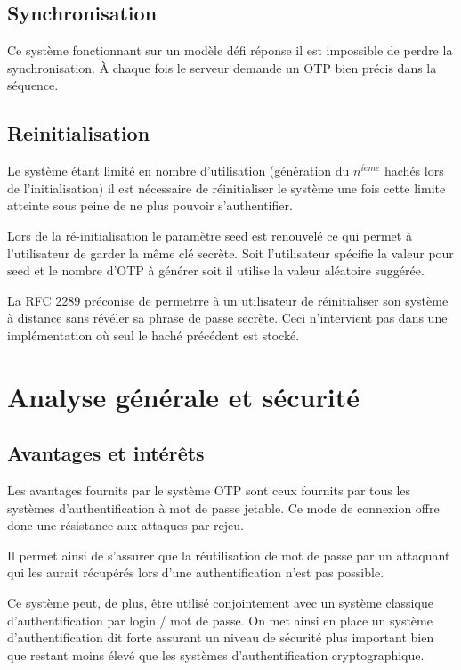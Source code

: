 \documentclass{../res/univ-projet}
\begin{document}
  \subsection{Synchronisation}
    Ce système fonctionnant sur un modèle défi réponse il est impossible de perdre
    la synchronisation. À chaque fois le serveur demande un OTP bien précis dans la séquence.
  
  \subsection{Reinitialisation}
    Le système étant limité en nombre d'utilisation (génération du $n^{i\grave{e}me}$ 
    hachés lors de l'initialisation) il est nécessaire de réinitialiser le système
    une fois cette limite atteinte sous peine de ne plus pouvoir s'authentifier.
    
    Lors de la ré-initialisation le paramètre seed est renouvelé ce qui permet à
    l'utilisateur de garder la même clé secrète. Soit l'utilisateur spécifie la valeur
    pour seed et le nombre d'OTP à générer soit il utilise la valeur aléatoire suggérée.
    
    La RFC 2289 préconise de permetrre à un utilisateur de réinitialiser son système
    à distance sans révéler sa phrase de passe secrète. Ceci n'intervient pas dans
    une implémentation où seul le haché précédent est stocké.

\section{Analyse générale et sécurité}
    \subsection{Avantages et intér\^ets}
    Les avantages fournits par le système OTP sont ceux fournits par tous les
    systèmes d'authentification à mot de passe jetable. Ce mode de connexion 
    offre donc une résistance aux attaques par rejeu.
    
    Il permet ainsi de s'assurer que la réutilisation de mot de passe par un
    attaquant qui les aurait récupérés lors d'une authentification n'est pas 
    possible.
    
    Ce système peut, de plus, être utilisé conjointement avec un système 
    classique d'authentification par login / mot de passe. On met ainsi en 
    place un système d'authentification dit forte assurant un niveau de 
    sécurité plus important bien que restant moins élevé que les systèmes
    d'authentification cryptographique.
  
\end{document}
